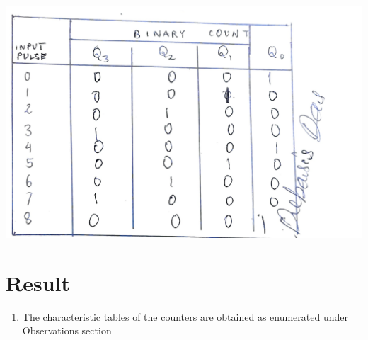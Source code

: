 \begin{center}
    \includegraphics[scale = 0.15]{Figures/tabring_1.jpg}
\end{center}
\section{Result}
\begin{enumerate}
    \item The characteristic tables of the counters are obtained as enumerated under Observations section
\end{enumerate}
